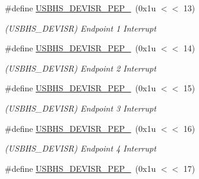\begin{DoxyCompactItemize}
\mbox{\label{group__SAMV71__USBHS_ga345d60ae5fbb8b49e41a2683d10441bc}} 
\#define \mbox{\hyperlink{group__SAMV71__USBHS_ga345d60ae5fbb8b49e41a2683d10441bc}{U\+S\+B\+H\+S\+\_\+\+D\+E\+V\+I\+S\+R\+\_\+\+P\+E\+P\+\_}}~(0x1u $<$$<$ 13)
\begin{DoxyCompactList}\small\item\em (U\+S\+B\+H\+S\+\_\+\+D\+E\+V\+I\+SR) Endpoint 1 Interrupt \end{DoxyCompactList}\item 
\mbox{\label{group__SAMV71__USBHS_ga2a38367a8545f2bf724d27f571b76b51}} 
\#define \mbox{\hyperlink{group__SAMV71__USBHS_ga2a38367a8545f2bf724d27f571b76b51}{U\+S\+B\+H\+S\+\_\+\+D\+E\+V\+I\+S\+R\+\_\+\+P\+E\+P\+\_}}~(0x1u $<$$<$ 14)
\begin{DoxyCompactList}\small\item\em (U\+S\+B\+H\+S\+\_\+\+D\+E\+V\+I\+SR) Endpoint 2 Interrupt \end{DoxyCompactList}\item 
\mbox{\label{group__SAMV71__USBHS_gaee2002bc42efc064ad362756f2e5a662}} 
\#define \mbox{\hyperlink{group__SAMV71__USBHS_gaee2002bc42efc064ad362756f2e5a662}{U\+S\+B\+H\+S\+\_\+\+D\+E\+V\+I\+S\+R\+\_\+\+P\+E\+P\+\_}}~(0x1u $<$$<$ 15)
\begin{DoxyCompactList}\small\item\em (U\+S\+B\+H\+S\+\_\+\+D\+E\+V\+I\+SR) Endpoint 3 Interrupt \end{DoxyCompactList}\item 
\mbox{\label{group__SAMV71__USBHS_gadb9cfdfcb42105fde79a159efd6d3175}} 
\#define \mbox{\hyperlink{group__SAMV71__USBHS_gadb9cfdfcb42105fde79a159efd6d3175}{U\+S\+B\+H\+S\+\_\+\+D\+E\+V\+I\+S\+R\+\_\+\+P\+E\+P\+\_}}~(0x1u $<$$<$ 16)
\begin{DoxyCompactList}\small\item\em (U\+S\+B\+H\+S\+\_\+\+D\+E\+V\+I\+SR) Endpoint 4 Interrupt \end{DoxyCompactList}\item 
\mbox{\label{group__SAMV71__USBHS_ga834ec84fbf0e965e4c8e6e042d75c50e}} 
\#define \mbox{\hyperlink{group__SAMV71__USBHS_ga834ec84fbf0e965e4c8e6e042d75c50e}{U\+S\+B\+H\+S\+\_\+\+D\+E\+V\+I\+S\+R\+\_\+\+P\+E\+P\+\_}}~(0x1u $<$$<$ 17)
$$
\end{DoxyCompactItemize}
